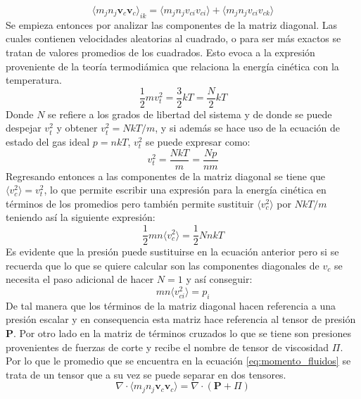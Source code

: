 \documentclass[../tesis_main_file.tex]{subfiles}
\begin{document}
\begin{equation}
\langle m_j n_j \textbf{v}_c \textbf{v}_c \rangle _{ik}=\langle m_j n_jv_{ci}v_{ci}\rangle+ \langle m_j n_jv_{ci}v_{ck}\rangle
\end{equation}
Se empieza entonces por analizar las componentes de la matriz diagonal.
Las cuales contienen velocidades aleatorias al cuadrado, o para ser más exactos se tratan de valores promedios de los cuadrados. Esto evoca a la expresión proveniente de la teoría termodiámica que relaciona la energía cinética con la temperatura.
\begin{equation}
\frac{1}{2}mv_t^2 =\frac{3}{2}kT=\frac{N}{2}kT
\end{equation}
Donde $N$ se refiere a los grados de libertad del sistema y de donde se puede despejar $v_t^2$ y obtener $v_t^2=NkT/m$, y si además se hace uso de la ecuación de estado del gas ideal $p=nkT$, $v^2_t$ se puede expresar como:
\begin{equation}
v_t^2=\frac{NkT}{m}=\frac{Np}{nm}
\end{equation}
Regresando entonces a las componentes de la matriz diagonal se tiene que $\langle v_c^2\rangle=v_t^2$, lo que permite escribir una expresión para la energía cinética en términos de los promedios pero también permite sustituir $\langle v_c^2\rangle$ por $NkT/m$ teniendo así la siguiente expresión:
\begin{equation}
\frac{1}{2}mn \langle v_c^2\rangle = \frac{1}{2}NnkT
\end{equation}
Es evidente que la presión puede sustituirse en la ecuación anterior pero si se recuerda que lo que se quiere calcular son las componentes diagonales de $v_c$ se necesita el paso adicional de hacer $N=1$ y así conseguir:
\begin{equation}
mn \langle v_{ci}^2\rangle = p_i
\end{equation} 
De tal manera que los términos de la matriz diagonal hacen referencia a una presión escalar y en consequencia esta matriz hace referencia al tensor de presión $\textbf{P}$.
Por otro lado en la matriz de términos cruzados lo que se tiene son presiones provenientes de fuerzas de corte \cite{bittencourt2013fundamentals} y recibe el nombre de tensor de viscosidad \textbf{$\Pi$}. Por lo que le promedio que se encuentra en la ecuación \ref{eq:momento_fluidos} se trata de un tensor que a su vez se puede separar en dos tensores.
\begin{equation}
\label{eq:tensor_p_vis}
\nabla \cdot \langle m_jn_j \textbf{v}_c \textbf{v}_c \rangle= \nabla \cdot (\textbf{P}+ \Pi)
\end{equation}
\end{document}
